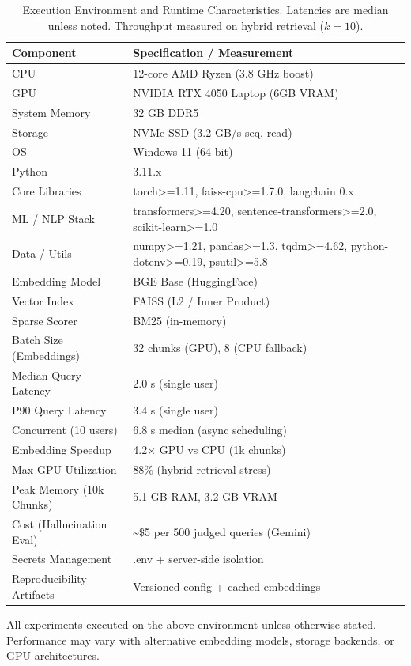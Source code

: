 \documentclass[conference]{IEEEtran}
\begin{document}
\begin{table}[!t]
\centering
\caption{Execution Environment and Runtime Characteristics. Latencies are median unless noted. Throughput measured on hybrid retrieval ($k=10$).}
\label{tab:environment}
\begin{tabular}{@{}l l@{}}
\toprule
Component & Specification / Measurement \\
\midrule
CPU & 12-core AMD Ryzen (3.8 GHz boost) \\
GPU & NVIDIA RTX 4050 Laptop (6GB VRAM) \\
System Memory & 32 GB DDR5 \\
Storage & NVMe SSD (3.2 GB/s seq. read) \\
OS & Windows 11 (64-bit) \\
Python & 3.11.x \\
Core Libraries & torch>=1.11, faiss-cpu>=1.7.0, langchain 0.x \\
ML / NLP Stack & transformers>=4.20, sentence-transformers>=2.0, scikit-learn>=1.0 \\
Data / Utils & numpy>=1.21, pandas>=1.3, tqdm>=4.62, python-dotenv>=0.19, psutil>=5.8 \\
Embedding Model & BGE Base (HuggingFace) \\
Vector Index & FAISS (L2 / Inner Product) \\
Sparse Scorer & BM25 (in-memory) \\
Batch Size (Embeddings) & 32 chunks (GPU), 8 (CPU fallback) \\
Median Query Latency & 2.0 s (single user) \\
P90 Query Latency & 3.4 s (single user) \\
Concurrent (10 users) & 6.8 s median (async scheduling) \\
Embedding Speedup & 4.2× GPU vs CPU (1k chunks) \\
Max GPU Utilization & 88\% (hybrid retrieval stress) \\
Peak Memory (10k Chunks) & 5.1 GB RAM, 3.2 GB VRAM \\
Cost (Hallucination Eval) & \textasciitilde\$5 per 500 judged queries (Gemini) \\
Secrets Management & .env + server-side isolation \\
Reproducibility Artifacts & Versioned config + cached embeddings \\
\bottomrule
\end{tabular}
\end{table}

All experiments executed on the above environment unless otherwise stated. Performance may vary with alternative embedding models, storage backends, or GPU architectures.
\end{document}
